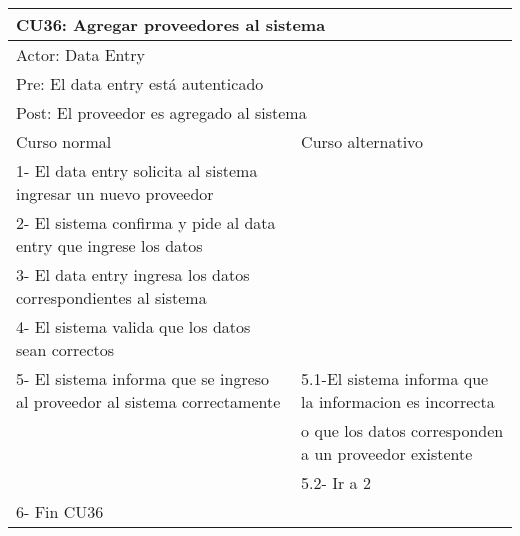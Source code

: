 \begin{table}[H]
  \begin{adjustbox}{max width = \textwidth}
  \begin{tabular}{|l|l|}
    \hline
    \multicolumn{2}{|l|}{CU36: Agregar proveedores al sistema} \\\hline
    \multicolumn{2}{|l|}{Actor: Data Entry} \\\hline
    \multicolumn{2}{|l|}{Pre: El data entry está autenticado} \\\hline
    \multicolumn{2}{|l|}{Post: El proveedor es agregado al sistema} \\\hline
     Curso normal & Curso alternativo\\ \hline
	 1- El data entry solicita al sistema ingresar un nuevo proveedor & \\ \hline
     2- El sistema confirma y pide al data entry que ingrese los datos & \\ \hline
     3- El data entry ingresa los datos correspondientes al sistema & \\ \hline
     4- El sistema valida que los datos sean correctos & \\ \hline
     5- El sistema informa que se ingreso al proveedor al sistema correctamente & 5.1-El sistema informa que la informacion es incorrecta \\ & o que los datos corresponden a un proveedor existente  \\ & 5.2- Ir a 2 \\ \hline
     6- Fin CU36 & \\ \hline
  \end{tabular}
  \end{adjustbox}
\end{table}



